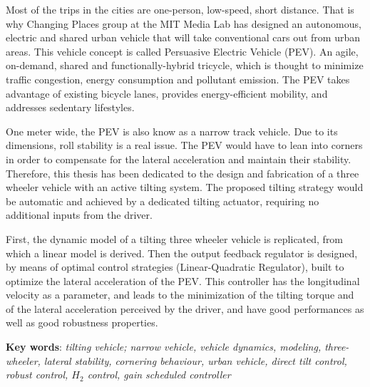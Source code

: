 % 
% 
%

\small
\justify
Most of the trips in the cities are one-person, low-speed, short distance. That is why Changing Places group at the MIT Media Lab has designed an autonomous, electric and shared urban vehicle that will take conventional cars out from urban areas. This vehicle concept is called Persuasive Electric Vehicle (PEV). An agile, on-demand, shared and functionally-hybrid tricycle, which is thought to minimize traffic congestion, energy consumption and pollutant emission. The PEV takes advantage of existing bicycle lanes, provides energy-efficient mobility, and addresses sedentary lifestyles. 

One meter wide, the PEV is also know as a narrow track vehicle. Due to its dimensions, roll stability is a real issue. The PEV would have to lean into corners in order to compensate for the lateral acceleration and maintain their stability. Therefore, this thesis has been dedicated to the design and fabrication of a three wheeler vehicle with an active tilting system. The proposed tilting strategy would be automatic and achieved by a dedicated tilting actuator, requiring no additional inputs from the driver.

First, the dynamic model of a tilting three wheeler vehicle is replicated, from which a linear model is derived. Then the output feedback regulator is designed, by means of optimal control strategies (Linear-Quadratic Regulator), built to optimize the lateral acceleration of the PEV. This controller has the longitudinal velocity as a parameter, and leads to the minimization of the tilting torque and of the lateral acceleration perceived by the driver, and have good performances as well as good robustness properties. 

\textbf{Key words}: \textit{tilting vehicle; narrow vehicle, vehicle dynamics, modeling, three-wheeler, lateral stability, cornering behaviour, urban vehicle, direct tilt control, robust control, $H_{2}$ control, gain scheduled controller}
